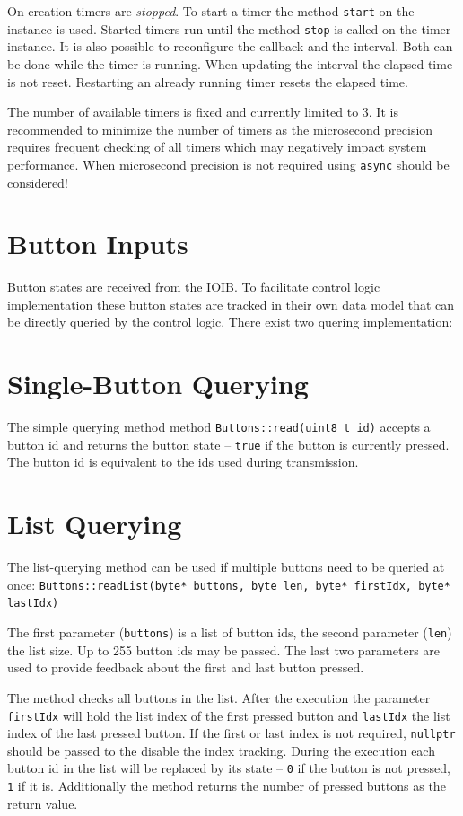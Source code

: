 \documentclass{scrreprt}
\newcommand{\code}[1]{\texttt{#1}}
\begin{document}
On creation timers are \emph{stopped}.
To start a timer the method \code{start} on the instance is used.
Started timers run until the method \code{stop} is called on the timer instance.
It is also possible to reconfigure the callback and the interval.
Both can be done while the timer is running.
When updating the interval the elapsed time is not reset.
Restarting an already running timer resets the elapsed time.

The number of available timers is fixed and currently limited to 3.
It is recommended to minimize the number of timers as the microsecond precision requires frequent checking of all timers which may negatively impact system performance.
When microsecond precision is not required using \code{async} should be considered!

\section{Button Inputs}
Button states are received from the IOIB.
To facilitate control logic implementation these button states are tracked in their own data model that can be directly queried by the control logic.
There exist two quering implementation:

\section{Single-Button Querying}
The simple querying method method \code{Buttons::read(uint8\_t id)} accepts a button id and returns the button state -- \code{true} if the button is currently pressed.
The button id is equivalent to the ids used during transmission.

\section{List Querying}
The list-querying method can be used if multiple buttons need to be queried at once:
\code{Buttons::readList(byte* buttons, byte len, byte* firstIdx, byte* lastIdx)}

The first parameter (\code{buttons}) is a list of button ids, the second parameter (\code{len}) the list size.
Up to 255 button ids may be passed.
The last two parameters are used to provide feedback about the first and last button pressed.

The method checks all buttons in the list.
After the execution the parameter \code{firstIdx} will hold the list index of the first pressed button and \code{lastIdx} the list index of the last pressed button.
If the first or last index is not required, \code{nullptr} should be passed to the disable the index tracking.
During the execution each button id in the list will be replaced by its state -- \code{0} if the button is not pressed, \code{1} if it is.
Additionally the method returns the number of pressed buttons as the return value.
\end{document}
